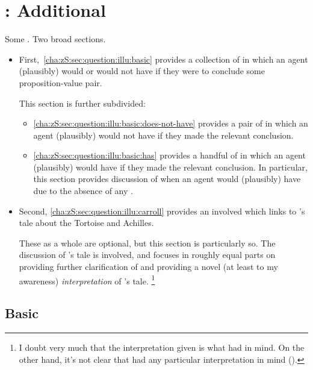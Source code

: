 \chapter{: Additional }
\label{cha:zS:sec:question:illu}

\begin{note}
  Some .
  Two broad sections.

  \begin{itemize}
  \item
    First,~\autoref{cha:zS:sec:question:illu:basic} provides a collection of  in which an agent (plausibly) would or would not have \zS{} if they were to conclude some proposition-value pair.

    This section is further subdivided:
    \begin{itemize}
    \item
      \autoref{cha:zS:sec:question:illu:basic:does-not-have} provides a pair of  in which an agent (plausibly) would not have \zS{} if they made the relevant conclusion.
    \item
      \autoref{cha:zS:sec:question:illu:basic:has} provides a handful of  in which an agent (plausibly) would have \zS{} if they made the relevant conclusion.
      In particular, this section provides discussion of when an agent would (plausibly) have \zS{} due to the absence of any .
    \end{itemize}
  \item
    Second, \autoref{cha:zS:sec:question:illu:carroll} provides an involved  which links \qzS{} to \citeauthor{Carroll:1895uj}'s tale about the Tortoise and Achilles.

    These  as a whole are optional, but this section is particularly so.
    The discussion of \citeauthor{Carroll:1895uj}'s tale is involved, and focuses in roughly equal parts on providing further clarification of \zS{} and providing a novel (at least to my awareness) \emph{interpretation} of \citeauthor{Carroll:1895uj}'s tale.%
    \footnote{
      I doubt very much that the interpretation given is what \citeauthor{Carroll:1895uj} had in mind.
      On the other hand, it's not clear that \citeauthor{Carroll:1895uj} had any particular interpretation in mind (\cite[Cf.][]{Thomson:2010tt}).
    }
  \end{itemize}
\end{note}

\section{Basic }
\label{cha:zS:sec:question:illu:basic}

